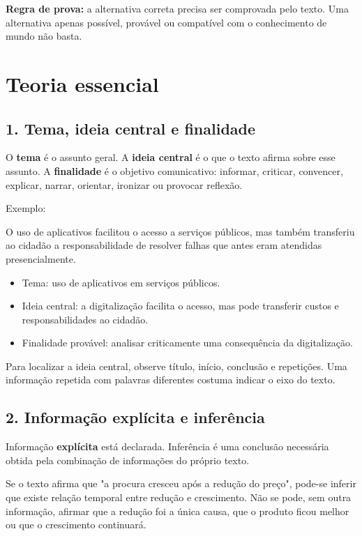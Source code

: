 \documentclass[11pt,a4paper]{article}
\begin{document}
\textbf{Regra de prova:} a alternativa correta precisa ser comprovada pelo texto. Uma alternativa apenas possível, provável ou compatível com o conhecimento de mundo não basta.

\section*{Teoria essencial}

\subsection*{1. Tema, ideia central e finalidade}

O \textbf{tema} é o assunto geral. A \textbf{ideia central} é o que o texto afirma sobre esse assunto. A \textbf{finalidade} é o objetivo comunicativo: informar, criticar, convencer, explicar, narrar, orientar, ironizar ou provocar reflexão.

Exemplo:

\begin{alerta}
O uso de aplicativos facilitou o acesso a serviços públicos, mas também transferiu ao cidadão a responsabilidade de resolver falhas que antes eram atendidas presencialmente.
\end{alerta}

\begin{itemize}
  \item Tema: uso de aplicativos em serviços públicos.
  \item Ideia central: a digitalização facilita o acesso, mas pode transferir custos e responsabilidades ao cidadão.
  \item Finalidade provável: analisar criticamente uma consequência da digitalização.
\end{itemize}

Para localizar a ideia central, observe título, início, conclusão e repetições. Uma informação repetida com palavras diferentes costuma indicar o eixo do texto.

\subsection*{2. Informação explícita e inferência}

Informação \textbf{explícita} está declarada. Inferência é uma conclusão necessária obtida pela combinação de informações do próprio texto.

Se o texto afirma que "a procura cresceu após a redução do preço", pode-se inferir que existe relação temporal entre redução e crescimento. Não se pode, sem outra informação, afirmar que a redução foi a única causa, que o produto ficou melhor ou que o crescimento continuará.
\end{document}
